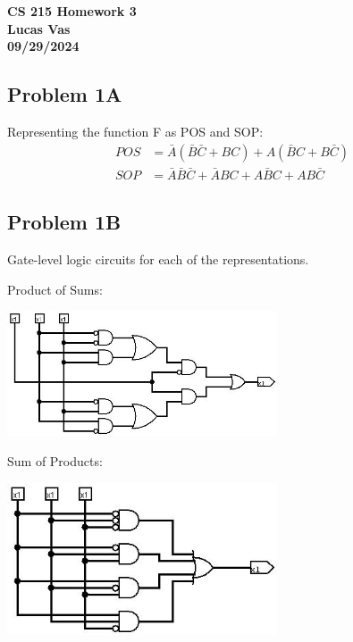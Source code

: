 \documentclass[12pt]{article}
\begin{document}
\begin{center}
	\textbf{CS 215 Homework 3} \\
	\textbf{Lucas Vas} \\
	\textbf{09/29/2024}
\end{center}

\subsection*{Problem 1A}
Representing the function F as POS and SOP:
\begin{equation*}
	\begin{split}
		POS & = \bar{A}(\bar{B}\bar{C} + BC) + A(\bar{B}C + B\bar{C})     \\
		SOP & = \bar{A}\bar{B}\bar{C} + \bar{A}BC + A\bar{B}C + AB\bar{C}
	\end{split}
\end{equation*}

\subsection*{Problem 1B}
Gate-level logic circuits for each of the representations.

Product of Sums:

\begin{center}
	\includegraphics[width=8cm]{cs215_hw3_pos.jpg}
\end{center}

Sum of Products:

\begin{center}
	\includegraphics[width=8cm]{cs215_hw3_sop.jpg}
\end{center}
\end{document}
